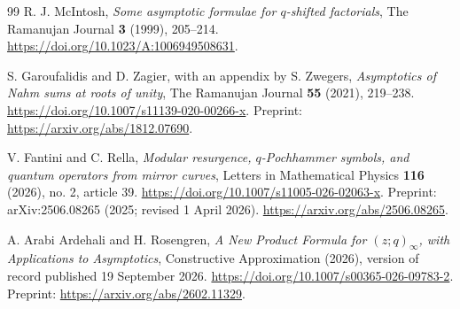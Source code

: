 \documentclass[11pt,a4paper]{article}
\numberwithin{equation}{section}
\theoremstyle{definition}\newtheorem{definition}[theorem]{Definition}
\theoremstyle{remark}\newtheorem{remark}[theorem]{Remark}
\begin{document}
\begin{thebibliography}{99}
R. J. McIntosh, \emph{Some asymptotic formulae for $q$-shifted factorials},
The Ramanujan Journal \textbf{3} (1999), 205--214.
\url{https://doi.org/10.1023/A:1006949508631}.

S. Garoufalidis and D. Zagier, with an appendix by S. Zwegers,
\emph{Asymptotics of Nahm sums at roots of unity}, The Ramanujan Journal
\textbf{55} (2021), 219--238.
\url{https://doi.org/10.1007/s11139-020-00266-x}.
Preprint: \url{https://arxiv.org/abs/1812.07690}.

V. Fantini and C. Rella, \emph{Modular resurgence, $q$-Pochhammer
symbols, and quantum operators from mirror curves}, Letters in
Mathematical Physics \textbf{116} (2026), no. 2, article 39.
\url{https://doi.org/10.1007/s11005-026-02063-x}.
Preprint: arXiv:2506.08265 (2025; revised 1 April 2026).
\url{https://arxiv.org/abs/2506.08265}.

A. Arabi Ardehali and H. Rosengren, \emph{A New Product Formula for
$(z;q)_\infty$, with Applications to Asymptotics}, Constructive
Approximation (2026), version of record published 19 September 2026.
\url{https://doi.org/10.1007/s00365-026-09783-2}.
Preprint: \url{https://arxiv.org/abs/2602.11329}.
\end{thebibliography}
\end{document}
